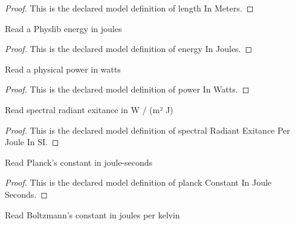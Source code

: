 \begin{proof}
  This is the declared model definition of length In Meters.
\end{proof}
\begin{definition}
  \label{def:physics:phyx-mini-0614:phyxminiproblems-problemphyxmini0614-energyinjoules}
  Read a Physlib energy in joules
\end{definition}
\begin{proof}
  This is the declared model definition of energy In Joules.
\end{proof}
\begin{definition}
  \label{def:physics:phyx-mini-0614:phyxminiproblems-problemphyxmini0614-powerinwatts}
  Read a physical power in watts
\end{definition}
\begin{proof}
  This is the declared model definition of power In Watts.
\end{proof}
\begin{definition}
  \label{def:physics:phyx-mini-0614:phyxminiproblems-problemphyxmini0614-spectralradiantexitanceperjouleinsi}
  Read spectral radiant exitance in W / (m² J)
\end{definition}
\begin{proof}
  This is the declared model definition of spectral Radiant Exitance Per Joule In SI.
\end{proof}
\begin{definition}
  \label{def:physics:phyx-mini-0614:phyxminiproblems-problemphyxmini0614-planckconstantinjouleseconds}
  Read Planck's constant in joule-seconds
\end{definition}
\begin{proof}
  This is the declared model definition of planck Constant In Joule Seconds.
\end{proof}
\begin{definition}
  \label{def:physics:phyx-mini-0614:phyxminiproblems-problemphyxmini0614-boltzmannconstantinjoulesperkelvin}
  Read Boltzmann's constant in joules per kelvin
\end{definition}
